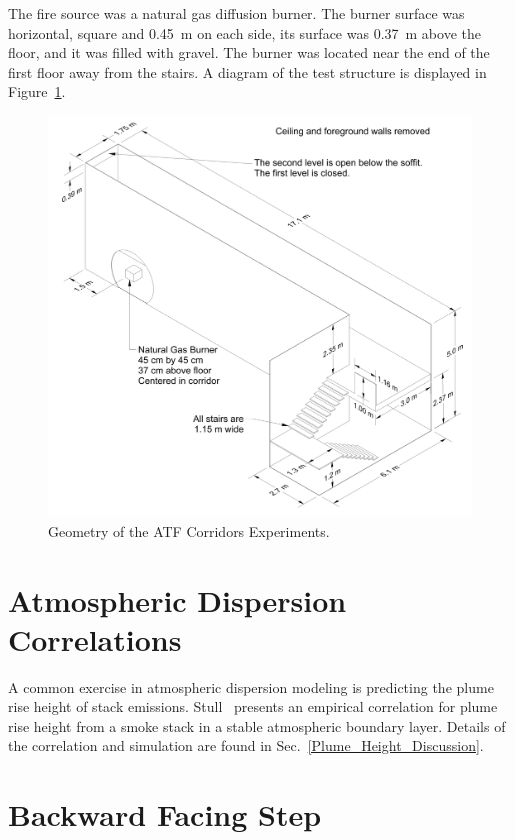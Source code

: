 The fire source was a natural gas diffusion burner.  The burner surface was horizontal, square and 0.45~m on each side, its surface was 0.37~m above the floor, and it was filled with gravel. The burner was located near the end of the first floor away from the stairs. A diagram of the test structure is displayed in Figure~\ref{ATF Drawing}.

\begin{figure}[p]
\includegraphics[width=\textwidth]{FIGURES/ATF_Corridors/ATF_Corridors_Drawing}
\caption{Geometry of the ATF Corridors Experiments.}
\label{ATF Drawing}
\end{figure}


\section{Atmospheric Dispersion Correlations}
\label{Atmospheric_Dispersion_Description}

A common exercise in atmospheric dispersion modeling is predicting the plume rise height of stack emissions. Stull~\cite{Stull:2000} presents an empirical correlation for plume rise height from a smoke stack in a stable atmospheric boundary layer. Details of the correlation and simulation are found in Sec.~\ref{Plume_Height_Discussion}.



\section{Backward Facing Step}
\label{Backward_Facing_Step_Description}

